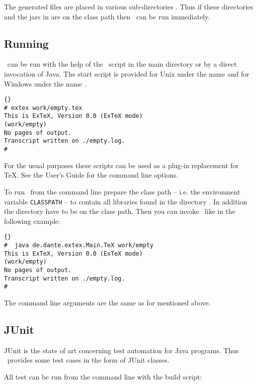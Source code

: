 The generated files are placed in various sub-directories
. Thus if these directories and the jars in
 are on the class path then \ExTeX\ can be run immediately.


\subsection{Running \ExTeX}

\ExTeX\ can be run with the help of the \ExTeX\ script in the main
directory or by a direct invocation of Java. The start script is
provided for Unix under the name  and for Windows under
the name .
\begin{lstlisting}{}
# extex work/empty.tex
This is ExTeX, Version 0.0 (ExTeX mode)
(work/empty)
No pages of output.
Transcript written on ./empty.log.
#
\end{lstlisting}{}

For the usual purposes these scripts can be used as a plug-in
replacement for \TeX. See the User's Guide for the command line
options.

To run \ExTeX\ from the command line prepare the class path -- i.e.
the environment variable \texttt{CLASSPATH} -- to contain all
libraries found in the directory . In addition the directory
 have to be on the class path. Then you can
invoke \ExTeX\ like in the following example:

\begin{lstlisting}{}
#  java de.dante.extex.Main.TeX work/empty
This is ExTeX, Version 0.0 (ExTeX mode)
(work/empty)
No pages of output.
Transcript written on ./empty.log.
#
\end{lstlisting}{}

The command line arguments are the same as for  mentioned
above.


\subsection{JUnit}\label{sec:shell-junit}

JUnit is the state of art concerning test automation for Java
programs. Thus \ExTeX\ provides some test cases in the form of JUnit
classes.

All test can be run from the command line with the build script:


